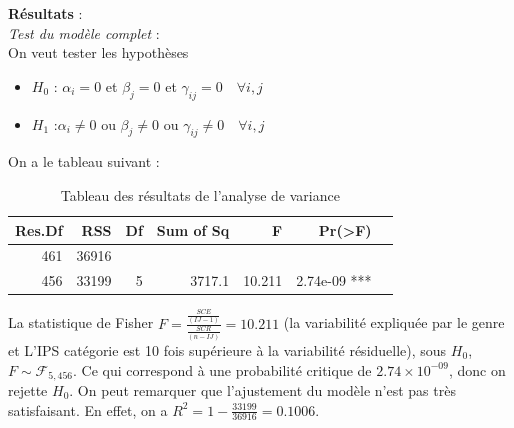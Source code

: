 \documentclass[12pt,a4paper]{article}
\begin{document}
	\textbf{Résultats} : \\
	\textit{Test du modèle complet} : \\
	On veut tester les hypothèses 
	\begin{itemize}
		\item \textbf{$H_0$} : $\alpha_i = 0$ et $\beta_j = 0$ et $\gamma_{ij} = 0 \quad \forall i,j$
		\item \textbf{$H_1$} :$\alpha_i \neq 0$ ou $\beta_j \neq 0$ ou $\gamma_{ij} \neq 0 \quad \forall i,j$
	\end{itemize}
	On a le tableau suivant : 
	\begin{table}[H]
		\centering
		\begin{tabular}{rrrrrrr}
			\toprule
			\textbf{Res.Df} & \textbf{RSS}  & \textbf{Df} & \textbf{Sum of Sq} & \textbf{F} & \textbf{Pr(>F)} \\ 
			\midrule
			461 & 36916 &    &           &        &           \\ 
			456 & 33199 &  5 & 3717.1    & 10.211 & 2.74e-09 *** \\ 
			\bottomrule
		\end{tabular}
		\caption{Tableau des résultats de l'analyse de variance}
		\label{table:3}
	\end{table}
	La statistique de Fisher $F = \frac{\frac{SCE}{(IJ - 1)}}{\frac{SCR}{(n - IJ)}} = 10.211$ (la variabilité expliquée par le genre et L'IPS catégorie est 10 fois supérieure à la variabilité résiduelle), sous $H_0$, $F \sim \mathcal{F}_{5,456}$. Ce qui correspond à une probabilité critique de $2.74 \times 10^{-09}$, donc on rejette $H_0$.
	On peut remarquer que l'ajustement du modèle n'est pas très satisfaisant. En effet, on a $R^2 = 1 - \frac{33199}{36916} = 0.1006$.\\
	
\end{document}
